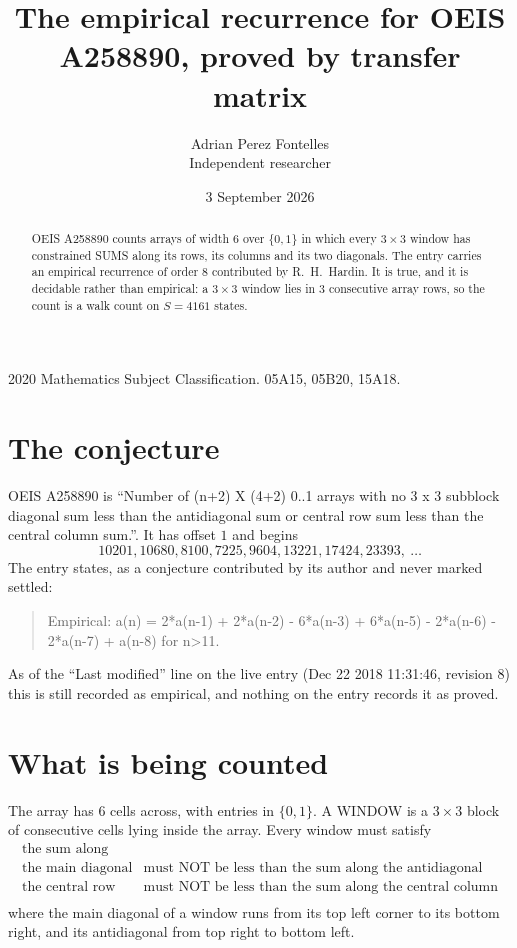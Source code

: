 \documentclass[11pt,a4paper]{article}
\title{The empirical recurrence for OEIS A258890, proved by transfer matrix}
\author{Adrian Perez Fontelles\\ \small Independent researcher}
\date{3 September 2026}
\theoremstyle{plain}
\theoremstyle{definition}
\begin{document}
\maketitle

\begin{abstract}
OEIS A258890 counts arrays of width $6$ over $\{0,1\}$ in which every $3\times3$ window has
constrained SUMS along its rows, its columns and its two diagonals. The entry carries an
empirical recurrence of order $8$ contributed by R.~H.~Hardin. It is true, and it is
decidable rather than empirical: a $3\times3$ window lies in $3$ consecutive array rows,
so the count is a walk count on $S=4161$ states.
\end{abstract}

\noindent\small 2020 Mathematics Subject Classification. 05A15, 05B20, 15A18.\normalsize

\section{The conjecture}

OEIS A258890 is ``Number of (n+2) X (4+2) 0..1 arrays with no 3 x 3 subblock diagonal sum less than the antidiagonal sum or central row sum less than the central column sum.''. It has offset $1$ and begins
\[
10201, 10680, 8100, 7225, 9604, 13221, 17424, 23393,\ \dots
\]
The entry states, as a conjecture contributed by its author and never marked settled:
\begin{quote}
Empirical: a(n) = 2*a(n-1) + 2*a(n-2) - 6*a(n-3) + 6*a(n-5) - 2*a(n-6) - 2*a(n-7) + a(n-8) for n>11.
\end{quote}
As of the ``Last modified'' line on the live entry (Dec 22 2018 11:31:46, revision 8) this is still
recorded as empirical, and nothing on the entry records it as proved.

\section{What is being counted}

The array has $6$ cells across, with entries in $\{0,1\}$. A WINDOW is a $3\times3$ block
of consecutive cells lying inside the array. Every window must satisfy
\[
\begin{array}{ll}
\text{the sum along} & \text{} \\[2pt]
\text{the main diagonal} & \text{must NOT be less than the sum along the antidiagonal} \\
\text{the central row} & \text{must NOT be less than the sum along the central column} \\
\end{array}
\]
where the main diagonal of a window runs from its top left corner to its bottom right, and its
antidiagonal from top right to bottom left.
\end{document}
